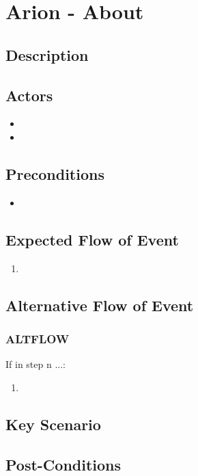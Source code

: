 \documentclass{scrreprt}
\begin{document}
\chapter*{Arion - About}

\section*{Description}

\section*{Actors}
\begin{itemize}
    \item 
    \item 
\end{itemize}

\section*{Preconditions}
\begin{itemize}
    \item 
\end{itemize}

\section*{Expected Flow of Event}
\begin{enumerate}[1.]
    \item 
\end{enumerate}

\section*{Alternative Flow of Event}
\subsection*{ALTFLOW}
If in step n ...:
\begin{enumerate}
    \item 
\end{enumerate}

\section*{Key Scenario}

\section*{Post-Conditions}
\end{document}
